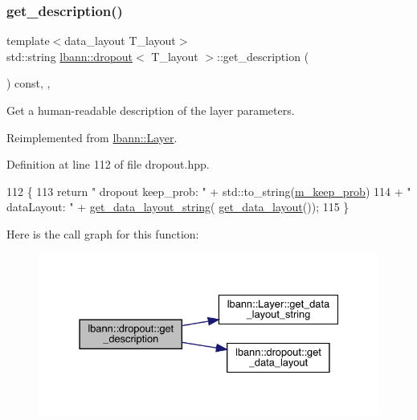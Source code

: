 \subsubsection{\texorpdfstring{get\+\_\+description()}{get\_description()}}
{\footnotesize\ttfamily template$<$data\+\_\+layout T\+\_\+layout$>$ \\
std\+::string \hyperlink{classlbann_1_1dropout}{lbann\+::dropout}$<$ T\+\_\+layout $>$\+::get\+\_\+description (\begin{DoxyParamCaption}{ }\end{DoxyParamCaption}) const\hspace{0.3cm}{\ttfamily [inline]}, {\ttfamily [override]}, {\ttfamily [virtual]}}

Get a human-\/readable description of the layer parameters. 

Reimplemented from \hyperlink{classlbann_1_1Layer_acc0803d3428914ca1eb5988c4309174a}{lbann\+::\+Layer}.



Definition at line 112 of file dropout.\+hpp.


\begin{DoxyCode}
112                                              \{
113     \textcolor{keywordflow}{return} \textcolor{stringliteral}{" dropout keep\_prob: "} + std::to\_string(\hyperlink{classlbann_1_1dropout_aa06cbee70f3426b589990889b8ac8872}{m\_keep\_prob}) 
114            + \textcolor{stringliteral}{" dataLayout: "} + \hyperlink{classlbann_1_1Layer_ae3f4a5602df821f4221614b1e3782dc1}{get\_data\_layout\_string}(
      \hyperlink{classlbann_1_1dropout_aefeb16614f9bf4b9e643e1d5b48ec62d}{get\_data\_layout}());
115   \}
\end{DoxyCode}
Here is the call graph for this function\+:\nopagebreak
\begin{figure}[H]
\begin{center}
\leavevmode
\includegraphics[width=331pt]{classlbann_1_1dropout_a7b53ee7d758337fe40788a567b5d092c_cgraph}
\end{center}
\end{figure}
\mbox{\label{classlbann_1_1dropout_a4d07cd79c7a4ab29db233a361aede358}} 
